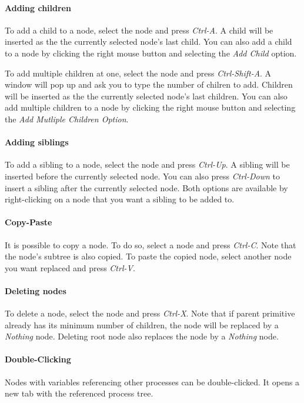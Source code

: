 \documentclass[a4paper,11pt]{report}
\begin{document}
\paragraph{Adding children}
To add a child to a node, select the node and press \emph{Ctrl-A}. A child will be inserted as the the currently selected node's last child. You can also add a child to a node by clicking the right mouse button and selecting the \emph{Add Child} option.

To add multiple children at one, select the node and press \emph{Ctrl-Shift-A}. A window will pop up and ask you to type the number of chilren to add. Children will be inserted as the the currently selected node's last children. You can also add multiple children to a node by clicking the right mouse button and selecting the \emph{Add Mutliple Children Option}.

\paragraph{Adding siblings}
To add a sibling to a node, select the node and press \emph{Ctrl-Up}. A sibling will be inserted before the currently selected node. You can also press \emph{Ctrl-Down} to insert a sibling after the currently selected node. Both options are available by right-clicking on a node that you want a sibling to be added to.

\paragraph{Copy-Paste}
It is possible to copy a node. To do so, select a node and press \emph{Ctrl-C}. Note that the node's subtree is also copied. To paste the copied node, select another node you want replaced and press \emph{Ctrl-V}.

\paragraph{Deleting nodes}
To delete a node, select the node and press \emph{Ctrl-X}. Note that if parent primitive already has its minimum number of children, the node will be replaced by a \emph{Nothing} node. Deleting root node also replaces the node by a \emph{Nothing} node.

\paragraph{Double-Clicking}
Nodes with variables referencing other processes can be double-clicked. It opens a new tab with the referenced process tree. 
\end{document}
